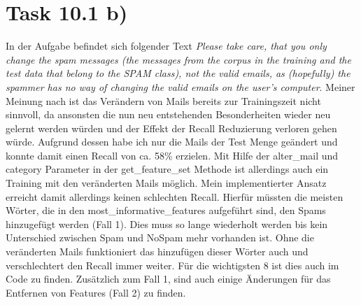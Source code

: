 \documentclass[12pt]{scrartcl}
\begin{document}
	\section*{Task 10.1 b)}
	In der Aufgabe befindet sich folgender Text \glqq{}\textit{Please take care, that you only change the spam messages (the messages from the corpus in the training and the test data that belong to the SPAM class), not the valid emails, as (hopefully) the spammer has no way of changing the valid emails on the user’s computer}\grqq{}. 
	Meiner Meinung nach ist das Verändern von Mails bereits zur Trainingszeit nicht sinnvoll, da ansonsten die nun neu entstehenden Besonderheiten wieder neu gelernt werden würden und der Effekt der Recall Reduzierung verloren gehen würde.
	Aufgrund dessen habe ich nur die Mails der Test Menge geändert und konnte damit einen Recall von ca. 58\% erzielen. 
	Mit Hilfe der alter\_mail und category Parameter in der get\_feature\_set Methode ist allerdings auch ein Training mit den veränderten Mails möglich. 
	Mein implementierter Ansatz erreicht damit allerdings keinen schlechten Recall. 
	Hierfür müssten die meisten Wörter, die in den most\_informative\_features aufgeführt sind, den Spams hinzugefügt werden (Fall 1).
	Dies muss so lange wiederholt werden bis kein Unterschied zwischen Spam und NoSpam mehr vorhanden ist. 
	Ohne die veränderten Mails funktioniert das hinzufügen dieser Wörter auch und verschlechtert den Recall immer weiter.
	Für die wichtigsten 8 ist dies auch im Code zu finden. 
	Zusätzlich zum Fall 1, sind auch einige Änderungen für das Entfernen von Features (Fall 2) zu finden.
	
	
	
	
\end{document}
